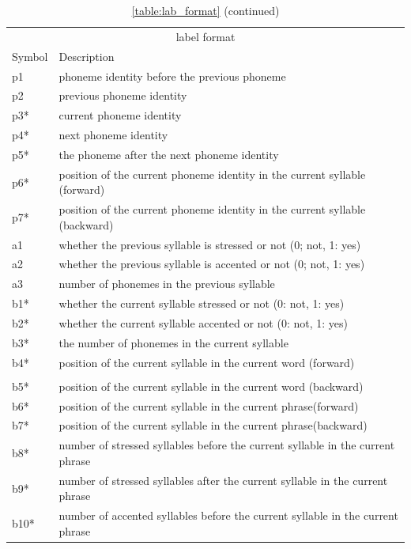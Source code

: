 \singlespacing
\begin{longtable}[!htpb]{p{} p{}}
\toprule
\multicolumn{2}{c}{label format} \\
\cline{1-2}
Symbol    & Description \\
\midrule
p1      & phoneme identity before the previous phoneme \\
p2      & previous phoneme identity \\
p3*      & current phoneme identity \\
p4*		& next phoneme identity \\
p5*		& the phoneme after the next phoneme identity \\
p6*		& position of the current phoneme identity in the current syllable (forward) \\
p7*		& position of the current phoneme identity in the current syllable (backward) \\
\midrule
a1 & whether the previous syllable is stressed or not (0; not, 1: yes)\\
a2 & whether the previous syllable is accented or not (0; not, 1: yes)\\
\toprule
a3 & number of phonemes in the previous syllable \\
b1* & whether the current syllable stressed or not (0: not, 1: yes)\\
b2* & whether the current syllable accented or not (0: not, 1: yes)\\
b3* & the number of phonemes in the current syllable\\
b4* & position of the current syllable in the current word (forward)\\
\caption*{\tablename{} \ref{table:lab_format} (continued)}\\
b5* & position of the current syllable in the current word (backward)\\
b6* & position of the current syllable in the current phrase(forward)\\
b7* & position of the current syllable in the current phrase(backward)\\
b8* & number of stressed syllables before the current syllable in the current phrase\\
b9* & number of stressed syllables after the current syllable in the current phrase\\
b10* & number of accented syllables before the current syllable in the current phrase\\

\end{longtable}
